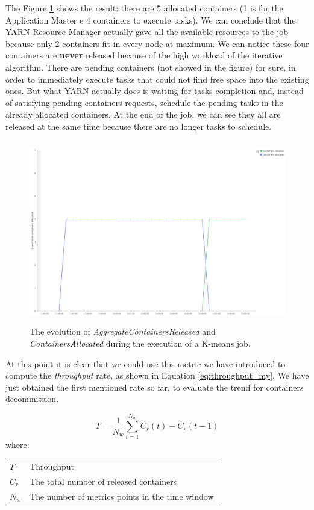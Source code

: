 \documentclass[12pt,twoside,cucitura]{toptesi}
\makeatletter
\newenvironment{conditions}
  {\par\vspace{\abovedisplayskip}\noindent\begin{tabular}{>{$}l<{$} @{${}={}$} l}}
  {\end{tabular}\par\vspace{\belowdisplayskip}}
\makeatother
\begin{document}
The Figure \ref{fig:released-metrics} shows the result: there are 5 allocated containers (1 is for the Application Master e 4 containers to execute tasks). We can conclude that the YARN Resource Manager actually gave all the available resources to the job because only 2 containers fit in every node at maximum. We can notice these four containers are \textbf{never} released because of the high workload of the iterative algorithm. There are pending containers (not showed in the figure) for sure, in order to immediately execute tasks that could not find free space into the existing ones. But what YARN actually does is waiting for tasks completion and, instead of satisfying pending containers requests, schedule the pending tasks in the already allocated containers. At the end of the job, we can see they all are released at the same time because there are no longer tasks to schedule.

\begin{figure}
\centering
\includegraphics[height=80mm]{released-metrics}
\caption{The evolution of \textit{AggregateContainersReleased} and \textit{ContainersAllocated} during the execution of a K-means job.}\label{fig:released-metrics}
\end{figure}

At this point it is clear that we could use this metric we have introduced to compute the \textit{throughput} rate, as shown in Equation \ref{eq:throughput_my}. We have just obtained the first mentioned rate so far, to evaluate the trend for containers decommission.

\begin{equation} \label{eq:throughput_my}
T = \frac{1}{N_{w} }\sum_{t = 1}^{N_{w} }C_{r}(t)-C_{r}(t-1)
\end{equation}
where:
\begin{conditions}
 T     &  Throughput \\
C_{r}    &  The total number of released containers \\ 
N_{w}   &   The number of metrics points in the time window 
\end{conditions}
\end{document}

